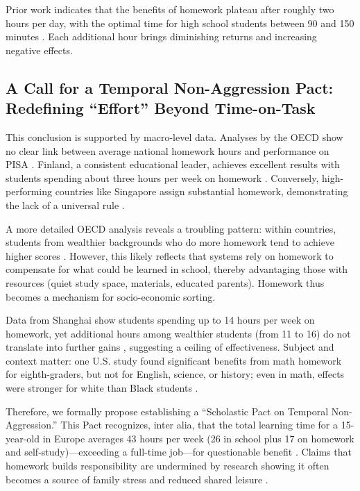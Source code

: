 \documentclass[12pt,a4paper]{article}
\begin{document}
Prior work indicates that the benefits of homework plateau after roughly two hours per day, with the optimal time for high school students between 90 and 150 minutes \autocite{pope2013}. Each additional hour brings diminishing returns and increasing negative effects.

\subsection{A Call for a Temporal Non-Aggression Pact: Redefining \enquote{Effort} Beyond Time-on-Task}
This conclusion is supported by macro-level data. Analyses by the OECD show no clear link between average national homework hours and performance on PISA \autocite{borgonovi2014,birch2018}. Finland, a consistent educational leader, achieves excellent results with students spending about three hours per week on homework \autocite{borgonovi2014}. Conversely, high-performing countries like Singapore assign substantial homework, demonstrating the lack of a universal rule \autocite{borgonovi2014}.

A more detailed OECD analysis reveals a troubling pattern: within countries, students from wealthier backgrounds who do more homework tend to achieve higher scores \autocite{borgonovi2014}. However, this likely reflects that systems rely on homework to compensate for what could be learned in school, thereby advantaging those with resources (quiet study space, materials, educated parents). Homework thus becomes a mechanism for socio-economic sorting.

Data from Shanghai show students spending up to 14 hours per week on homework, yet additional hours among wealthier students (from 11 to 16) do not translate into further gains \autocite{borgonovi2014}, suggesting a ceiling of effectiveness. Subject and context matter: one U.S. study found significant benefits from math homework for eighth-graders, but not for English, science, or history; even in math, effects were stronger for white than Black students \autocite{borgonovi2014}.

Therefore, we formally propose establishing a \enquote{Scholastic Pact on Temporal Non-Aggression.} This Pact recognizes, inter alia, that the total learning time for a 15-year-old in Europe averages 43 hours per week (26 in school plus 17 on homework and self-study)---exceeding a full-time job---for questionable benefit \autocite{birch2018}. Claims that homework builds responsibility are undermined by research showing it often becomes a source of family stress and reduced shared leisure \autocite{birch2018}.
\end{document}
